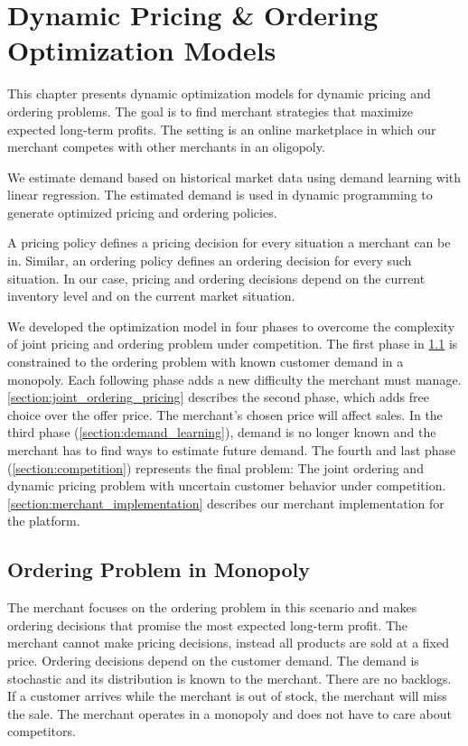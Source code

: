 
\chapter{Dynamic Pricing \& Ordering Optimization Models}
\label{chapter:models}
This chapter presents dynamic optimization models for dynamic pricing and ordering problems.
The goal is to find merchant strategies that maximize expected long-term profits.
The setting is an online marketplace in which our merchant competes with other merchants in an oligopoly.

We estimate demand based on historical market data using demand learning with linear regression.
The estimated demand is used in dynamic programming to generate optimized pricing and ordering policies.

A pricing policy defines a pricing decision for every situation a merchant can be in. Similar, an ordering policy defines an ordering decision for every such situation.
In our case, pricing and ordering decisions depend on the current inventory level and on the current market situation.

We developed the optimization model in four phases to overcome the complexity of joint pricing and ordering problem under competition.
The first phase in \cref{section:ordering} is constrained to the ordering problem with known customer demand in a monopoly.
Each following phase adds a new difficulty the merchant must manage.
\cref{section:joint_ordering_pricing} describes the second phase, which adds free choice over the offer price.
The merchant's chosen price will affect sales.
In the third phase (\cref{section:demand_learning}), demand is no longer known and the merchant has to find ways to estimate future demand.
The fourth and last phase (\cref{section:competition}) represents the final problem: The joint ordering and dynamic pricing problem with uncertain customer behavior under competition.
\cref{section:merchant_implementation} describes our merchant implementation for the \pricewars platform.

\section{Ordering Problem in Monopoly}
\label{section:ordering}
The merchant focuses on the ordering problem in this scenario and makes ordering decisions that promise the most expected long-term profit.
The merchant cannot make pricing decisions, instead all products are sold at a fixed price.
Ordering decisions depend on the customer demand.
The demand is stochastic and its distribution is known to the merchant.
There are no backlogs.
If a customer arrives while the merchant is out of stock, the merchant will miss the sale.
The merchant operates in a monopoly and does not have to care about competitors.

